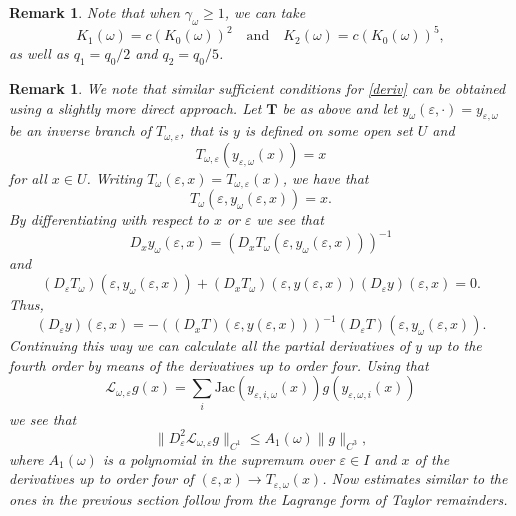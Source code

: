 \documentclass[11pt,reqno,a4paper]{article}
\theoremstyle{special}
\newtheorem{remark}[theorem]{Remark}
\def\om{\omega}
\begin{document}

\begin{remark}\label{K12}
Note that when $\gamma_\om \ge 1$, we can take
\[
K_1(\om)=c(K_0(\om))^2 \quad \text{and} \quad K_2(\om)=c(K_0(\om))^5,
\]
as well as $q_1=q_0/2$ and $q_2=q_0/5$.
\end{remark}


\begin{remark}
We note that similar sufficient conditions for \eqref{deriv} can be obtained using a slightly more direct approach. Let $\mathbf T$ be as above and 
let $y_\om(\varepsilon,\cdot)=y_{ \varepsilon, \om}$ be an inverse branch of $T_{\om, \varepsilon}$, that is $y$ is defined on some open set $U$ and 
$$
T_{\om, \varepsilon}(y_{\varepsilon, \om}(x))=x
$$
for all $x\in U$. Writing $T_\om(\varepsilon, x)=T_{\om, \varepsilon}(x)$,  we have that 
\begin{equation}\label{base}
 T_\om (\varepsilon,y_\om(\varepsilon,x))=x.  \end{equation}
By differentiating with respect to  $x$ or $\varepsilon$  we see that 
 $$
D_x y_\om(\varepsilon,x)=(D_xT_\om(\varepsilon,y_\om(\varepsilon, x)))^{-1}
 $$
 and
 $$
(D_\varepsilon T_\om)(\varepsilon,y_\om(\varepsilon,x))+(D_x T_\om)(\varepsilon,y(\varepsilon,x))(D_\varepsilon y)(\varepsilon,x)=0.
 $$
 Thus, 
 \begin{equation}\label{D y eps1}
(D_\varepsilon y)(\varepsilon,x)=-\left((D_x T)(\varepsilon,y(\varepsilon,x))\right)^{-1}(D_\varepsilon T)(\varepsilon,y_\om(\varepsilon,x)).     
 \end{equation}
Continuing this way we can calculate all the partial derivatives of $y$ up to the fourth order  by means of the derivatives up to  order four. Using that 
$$
\mathcal L_{\om, \varepsilon}g(x)=\sum_i\text{Jac}(y_{\varepsilon, i,\om}(x))g(y_{\varepsilon,\om,i}(x))
$$
we see that 
$$
\|D_\varepsilon^2\mathcal L_{\om, \varepsilon}g\|_{C^1}\leq A_1(\om)\|g\|_{C^3},
$$
where $A_1(\om)$ is a polynomial in the supremum over $\varepsilon\in I$ and $x$ of the derivatives up to order four of $(\varepsilon,x)\to T_{\varepsilon,\om}(x)$. Now estimates similar to the ones in the previous section  follow from the Lagrange form of Taylor remainders.
\end{remark}
\end{document}
